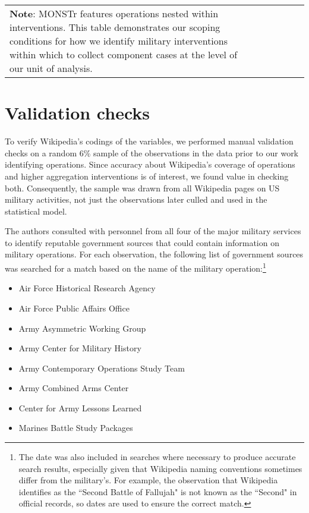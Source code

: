\documentclass[fleqn,12pt]{article}
\begin{document}
\begin{table}[H]
\begin{center}
\begin{tabular}{lccccc}
                {\parbox[b][.5in][c]{6.2in}{\scriptsize{\textbf{Note}: MONSTr features operations nested within interventions. This table demonstrates our scoping conditions for how we identify military interventions within which to collect component cases at the level of our unit of analysis.}}}
			\end{tabular}
		\end{center}
	\end{table}

\section{Validation checks}
To verify Wikipedia's codings of the variables, we performed manual validation checks on a random 6\% sample of the observations in the data prior to our work identifying operations. Since accuracy about Wikipedia's coverage of operations and higher aggregation interventions is of interest, we found value in checking both. Consequently, the sample was drawn from all Wikipedia pages on US military activities, not just the observations later culled and used in the statistical model.

The authors consulted with personnel from all four of the major military services to identify reputable government sources that could contain information on military operations. For each observation, the following list of government sources was searched for a match based on the name of the military operation:\footnote{The date was also included in searches where necessary to produce accurate search results, especially given that Wikipedia naming conventions sometimes differ from the military's. For example, the observation that Wikipedia identifies as the ``Second Battle of Fallujah" is not known as the ``Second" in official records, so dates are used to ensure the correct match.} \\

\begin{itemize}
    \item Air Force Historical Research Agency
    \item Air Force Public Affairs Office
    \item Army Asymmetric Working Group
    \item Army Center for Military History
    \item Army Contemporary Operations Study Team
    \item Army Combined Arms Center
    \item Center for Army Lessons Learned
    \item Marines Battle Study Packages
\end{itemize}
\end{document}
